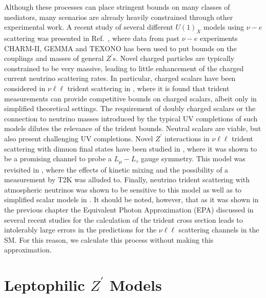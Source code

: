 Although these processes can place stringent bounds on many classes of mediators, many scenarios are already heavily constrained through other experimental work. A recent study of several different $U(1)_X$ models using $\nu-e$ scattering was presented in Ref.~\cite{Lindner:2018kjo}, where data from past $\nu-e$ experiments CHARM-II, GEMMA and TEXONO has been used to put bounds on the couplings and masses of general $Z^\prime$s. Novel charged particles are typically constrained to be very massive, leading to little enhancement of the charged current neutrino scattering rates. In particular, charged scalars have been considered in $\nu\ell\ell$ trident scattering in , where it is found that trident measurements can provide competitive bounds on charged scalars, albeit only in simplified theoretical settings. The requirement of doubly charged scalars or the connection to neutrino masses introduced by the typical UV completions of such models dilutes the relevance of the trident bounds. Neutral scalars are viable, but also present challenging UV completions. Novel $Z^\prime$ interactions in $\nu\ell\ell$ trident scattering with dimuon final states have been studied in , where it was shown to be a promising channel to probe a $L_\mu-L_\tau$ gauge symmetry. This model was revisited in , where the effects of kinetic mixing and the possibility of a measurement by T2K was alluded to. Finally, neutrino trident scattering with atmospheric neutrinos was shown to be sensitive to this model as well as to simplified scalar models in \cite{Ge:2017poy}. It should be noted, however, that as it was shown in the previous chapter the Equivalent Photon Approximation (EPA) discussed in several recent studies \cite{Magill:2017mps, Kaneta:2016uyt} for the calculation of the trident cross section leads to intolerably large errors in the predictions for the $\nu\ell\ell$ scattering channels in the SM. For this reason, we calculate this process without making this approximation.


\section{\label{sec:models}Leptophilic $Z^\prime$ Models}

